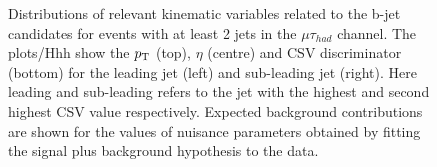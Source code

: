 \begin{figure}
\begin{center}
\end{center}
\caption{
  Distributions of relevant kinematic variables related to the b-jet candidates for
  events with at least 2 jets in the $\mu\tau_{had}$ channel. The plots/Hhh show the
  $p_{\mathrm{T}}$ (top), $\eta$ (centre) and CSV discriminator (bottom) for the leading
  jet (left) and sub-leading jet (right). Here leading and sub-leading refers to
  the jet with the highest and second highest CSV value respectively.
  Expected background contributions are shown for the values of nuisance parameters
  obtained by fitting the signal plus background hypothesis to the data.
}
\label{fig:resultsControlPlotsJetPairMuTau}
\end{figure} 


